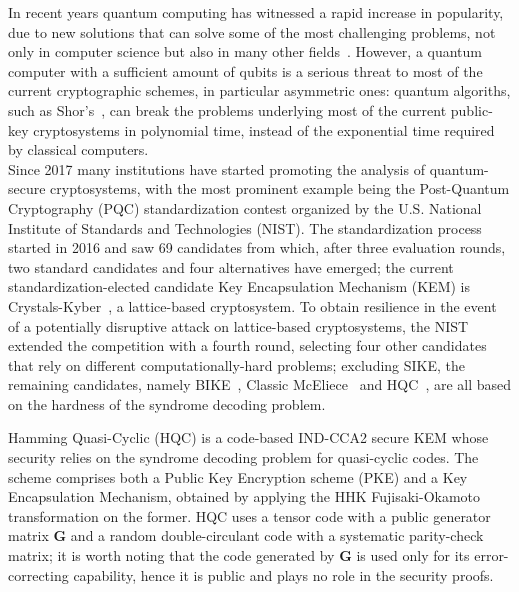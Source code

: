 In recent years quantum computing has witnessed a rapid increase in popularity, due to new solutions that can 
solve some of the most challenging problems, not only in computer science but also in many other fields~\cite{biondi2021quantum}.
However, a quantum computer with a sufficient amount of qubits is a serious threat to most of the current cryptographic
schemes, in particular asymmetric ones: quantum algoriths, such as Shor's~\cite{DBLP:conf/focs/Shor94}, can break the problems underlying
most of the current public-key cryptosystems in polynomial time, instead of the exponential time required by classical computers.\\
Since 2017 many institutions have started promoting the analysis of quantum-secure cryptosystems, with the most
prominent example being the Post-Quantum Cryptography (PQC) standardization contest organized by the U.S. National
Institute of Standards and Technologies (NIST). The standardization process started in 2016 and saw 
69 candidates from which, after three evaluation rounds, two standard candidates and four alternatives have emerged; 
the current standardization-elected candidate Key Encapsulation Mechanism (KEM) is Crystals-Kyber~\cite{DBLP:journals/iacr/BosDKLLSSS17}, 
a lattice-based cryptosystem.
To obtain resilience in the event of a potentially disruptive attack on lattice-based cryptosystems, the NIST extended the competition
with a fourth round, selecting four other candidates that rely on different computationally-hard problems; excluding SIKE, the remaining candidates,
namely BIKE~\cite{BIKE}, Classic McEliece~\cite{ClassicMcEliece} and HQC~\cite{melchor2018hamming}, are all based on 
the hardness of the syndrome decoding problem.

Hamming Quasi-Cyclic (HQC) is a code-based IND-CCA2 secure KEM whose security relies on the syndrome decoding problem for
quasi-cyclic codes. The scheme comprises both a Public Key Encryption scheme (PKE) and a Key Encapsulation Mechanism, 
obtained by applying the HHK Fujisaki-Okamoto transformation on the former. HQC uses a tensor code with a public generator
matrix $\mathbf{G}$ and a random double-circulant code with a systematic parity-check matrix; it is worth noting that the 
code generated by $\mathbf{G}$ is used only for its error-correcting capability, hence it is public and plays no role
in the security proofs.

